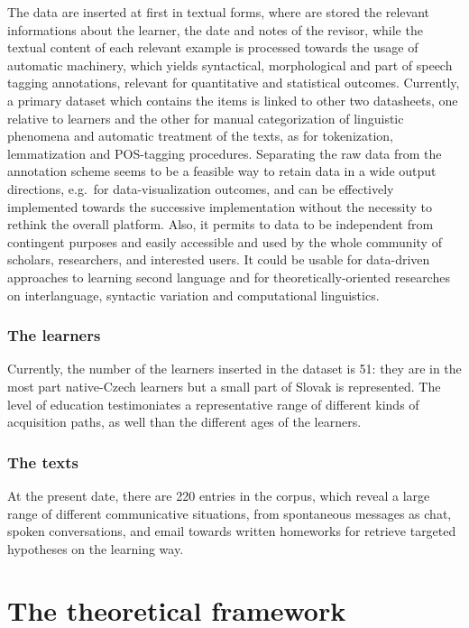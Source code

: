 \documentclass[a4paper,twoside,11pt,chapterprefix=false,bibliography=totocnumbered]{scrbook}
\theoremstyle{definition}
\theoremstyle{definition}
\theoremstyle{definition}
\theoremstyle{remark}
\begin{document}
The data are inserted at first in textual forms, where are stored the
relevant informations about the learner, the date and notes of the
revisor, while the textual content of each relevant example is processed
towards the usage of automatic machinery, which yields syntactical,
morphological and part of speech tagging annotations, relevant for
quantitative and statistical outcomes. Currently, a primary dataset
which contains the items is linked to other two datasheets, one relative
to learners and the other for manual categorization of linguistic
phenomena and automatic treatment of the texts, as for tokenization,
lemmatization and POS-tagging procedures. Separating the raw data from
the annotation scheme seems to be a feasible way to retain data in a
wide output directions, e.g.~for data-visualization outcomes, and can be
effectively implemented towards the successive implementation without
the necessity to rethink the overall platform. Also, it permits to data
to be independent from contingent purposes and easily accessible and
used by the whole community of scholars, researchers, and interested
users. It could be usable for data-driven approaches to learning second
language and for theoretically-oriented researches on interlanguage,
syntactic variation and computational linguistics.

\subsubsection{The learners}\label{the-learners}

Currently, the number of the learners inserted in the dataset is 51:
they are in the most part native-Czech learners but a small part of
Slovak is represented. The level of education testimoniates a
representative range of different kinds of acquisition paths, as well
than the different ages of the learners.

\subsubsection{The texts}\label{the-texts}

At the present date, there are 220 entries in the corpus, which reveal a
large range of different communicative situations, from spontaneous
messages as chat, spoken conversations, and email towards written
homeworks for retrieve targeted hypotheses on the learning way.

\section{The theoretical framework}\label{the-theoretical-framework}
\end{document}
